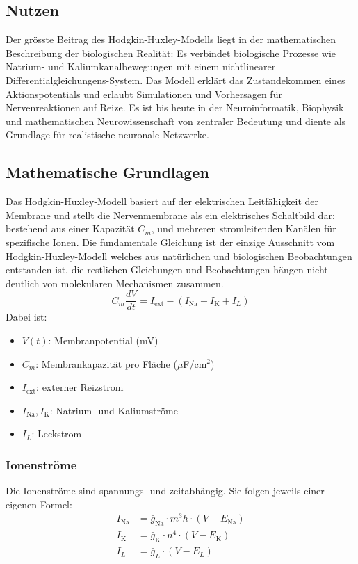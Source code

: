 \begin{refsection}
\subsection{Nutzen}
Der grösste Beitrag des Hodgkin-Huxley-Modells liegt in der mathematischen Beschreibung der biologischen Realität: Es verbindet biologische Prozesse wie Natrium- und Kaliumkanalbewegungen mit einem nichtlinearer Differentialgleichungens-System. Das Modell erklärt das Zustandekommen eines Aktionspotentials und erlaubt Simulationen und Vorhersagen für Nervenreaktionen auf Reize. Es ist bis heute in der Neuroinformatik, Biophysik und mathematischen Neurowissenschaft von zentraler Bedeutung und diente als Grundlage für realistische neuronale Netzwerke.
\subsection{Mathematische Grundlagen}
Das Hodgkin-Huxley-Modell basiert auf der elektrischen Leitfähigkeit der Membrane und stellt die Nervenmembrane als ein elektrisches Schaltbild dar: bestehend aus einer Kapazität $C_m$, und mehreren stromleitenden Kanälen für spezifische Ionen.
Die fundamentale Gleichung ist der einzige Ausschnitt vom Hodgkin-Huxley-Modell welches aus natürlichen und biologischen Beobachtungen entstanden ist, die restlichen Gleichungen und Beobachtungen hängen nicht deutlich von molekularen Mechanismen zusammen.
\[C_m \frac{dV}{dt} = I_{\text{ext}} - (I_{\text{Na}} + I_{\text{K}} + I_L)\]
Dabei ist:

\begin{itemize}
	\item $V(t)$: Membranpotential (mV)
	\item $C_m$: Membrankapazität pro Fläche ($\mu$F/cm$^2$)
	\item $I_{\text{ext}}$: externer Reizstrom
	\item $I_{\text{Na}}, I_{\text{K}}$: Natrium- und Kaliumströme
	\item $I_L$: Leckstrom
\end{itemize}
\subsubsection{Ionenströme}
Die Ionenströme sind spannungs- und zeitabhängig. Sie folgen jeweils einer eigenen Formel:
\[
\begin{aligned}
	I_{\text{Na}} &= \bar{g}_{\text{Na}} \cdot m^3 h \cdot (V - E_{\text{Na}}) \\
	I_{\text{K}} &= \bar{g}_{\text{K}} \cdot n^4 \cdot (V - E_{\text{K}}) \\
	I_L &= \bar{g}_L \cdot (V - E_L)
\end{aligned}
\]


\end{refsection}
